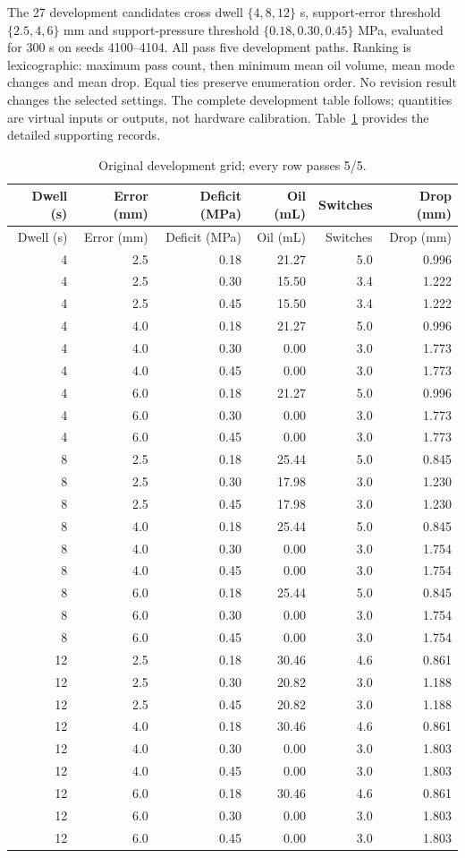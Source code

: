 \documentclass[11pt,a4paper]{article}
\begin{document}
The 27 development candidates cross dwell $\{4,8,12\}$ s, support-error threshold $\{2.5,4,6\}$ mm and support-pressure threshold $\{0.18,0.30,0.45\}$ MPa, evaluated for 300 s on seeds 4100--4104. All pass five development paths. Ranking is lexicographic: maximum pass count, then minimum mean oil volume, mean mode changes and mean drop. Equal ties preserve enumeration order. No revision result changes the selected settings. The complete development table follows; quantities are virtual inputs or outputs, not hardware calibration.
Table~\ref{supp:longtable:1} provides the detailed supporting records.
\begin{longtable}{rrrrrr}\caption{Original development grid; every row passes 5/5.}\label{supp:longtable:1}\\\toprule Dwell (s)&Error (mm)&Deficit (MPa)&Oil (mL)&Switches&Drop (mm)\\\midrule\endfirsthead
\toprule Dwell (s)&Error (mm)&Deficit (MPa)&Oil (mL)&Switches&Drop (mm)\\\midrule\endhead
4 & 2.5 & 0.18 & 21.27 & 5.0 & 0.996 \\
4 & 2.5 & 0.30 & 15.50 & 3.4 & 1.222 \\
4 & 2.5 & 0.45 & 15.50 & 3.4 & 1.222 \\
4 & 4.0 & 0.18 & 21.27 & 5.0 & 0.996 \\
4 & 4.0 & 0.30 & 0.00 & 3.0 & 1.773 \\
4 & 4.0 & 0.45 & 0.00 & 3.0 & 1.773 \\
4 & 6.0 & 0.18 & 21.27 & 5.0 & 0.996 \\
4 & 6.0 & 0.30 & 0.00 & 3.0 & 1.773 \\
4 & 6.0 & 0.45 & 0.00 & 3.0 & 1.773 \\
8 & 2.5 & 0.18 & 25.44 & 5.0 & 0.845 \\
8 & 2.5 & 0.30 & 17.98 & 3.0 & 1.230 \\
8 & 2.5 & 0.45 & 17.98 & 3.0 & 1.230 \\
8 & 4.0 & 0.18 & 25.44 & 5.0 & 0.845 \\
8 & 4.0 & 0.30 & 0.00 & 3.0 & 1.754 \\
8 & 4.0 & 0.45 & 0.00 & 3.0 & 1.754 \\
8 & 6.0 & 0.18 & 25.44 & 5.0 & 0.845 \\
8 & 6.0 & 0.30 & 0.00 & 3.0 & 1.754 \\
8 & 6.0 & 0.45 & 0.00 & 3.0 & 1.754 \\
12 & 2.5 & 0.18 & 30.46 & 4.6 & 0.861 \\
12 & 2.5 & 0.30 & 20.82 & 3.0 & 1.188 \\
12 & 2.5 & 0.45 & 20.82 & 3.0 & 1.188 \\
12 & 4.0 & 0.18 & 30.46 & 4.6 & 0.861 \\
12 & 4.0 & 0.30 & 0.00 & 3.0 & 1.803 \\
12 & 4.0 & 0.45 & 0.00 & 3.0 & 1.803 \\
12 & 6.0 & 0.18 & 30.46 & 4.6 & 0.861 \\
12 & 6.0 & 0.30 & 0.00 & 3.0 & 1.803 \\
12 & 6.0 & 0.45 & 0.00 & 3.0 & 1.803 \\
\bottomrule\end{longtable}
\end{document}
